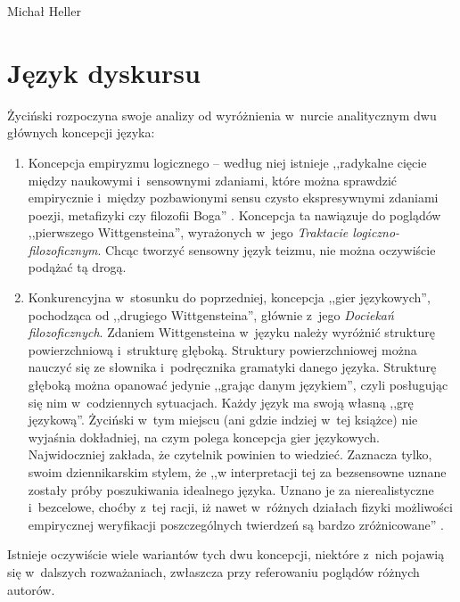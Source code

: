 \begin{artplenv}{Michał Heller}
\section{Język dyskursu}
Życiński rozpoczyna swoje analizy od wyróżnienia w~nurcie analitycznym dwu głównych koncepcji języka:

\begin{enumerate}
\item Koncepcja empiryzmu logicznego -- według niej istnieje ,,radykalne cięcie między naukowymi i~sensownymi zdaniami, które można sprawdzić empirycznie i~między pozbawionymi sensu czysto ekspresywnymi zdaniami poezji, metafizyki czy filozofii Boga''
\parencite[][s.~13]{zycinski_teizm_1985}. %
 Koncepcja ta nawiązuje do poglądów ,,pierwszego Wittgensteina'', wyrażonych w~jego \textit{Traktacie logiczno-filozoficznym}. Chcąc tworzyć sensowny język teizmu, nie można oczywiście podążać tą drogą.
\item Konkurencyjna w~stosunku do poprzedniej, koncepcja ,,gier językowych'', pochodząca od ,,drugiego Wittgensteina'', głównie z~jego \textit{Dociekań filozoficznych}. Zdaniem Wittgensteina w~języku należy wyróżnić strukturę powierzchniową i~strukturę głęboką. Struktury powierzchniowej można nauczyć się ze słownika i~podręcznika gramatyki danego języka. Strukturę głęboką można opanować jedynie ,,grając danym językiem'', czyli posługując się nim w~codziennych sytuacjach. Każdy język ma swoją własną ,,grę językową''. Życiński w~tym miejscu (ani gdzie indziej w~tej książce) nie wyjaśnia dokładniej, na czym polega koncepcja gier językowych. Najwidoczniej zakłada, że czytelnik powinien to wiedzieć. Zaznacza tylko, swoim dziennikarskim stylem, że ,,w interpretacji tej za bezsensowne uznane zostały próby poszukiwania idealnego języka. Uznano je za nierealistyczne i~bezcelowe, choćby z~tej racji, iż nawet w~różnych działach fizyki możliwości empirycznej weryfikacji poszczególnych twierdzeń są bardzo zróżnicowane''
\parencite[][s.~13]{zycinski_teizm_1985}.%

\end{enumerate}
Istnieje oczywiście wiele wariantów tych dwu koncepcji, niektóre z~nich pojawią się w~dalszych rozważaniach, zwłaszcza przy referowaniu poglądów różnych autorów.


\end{artplenv}

